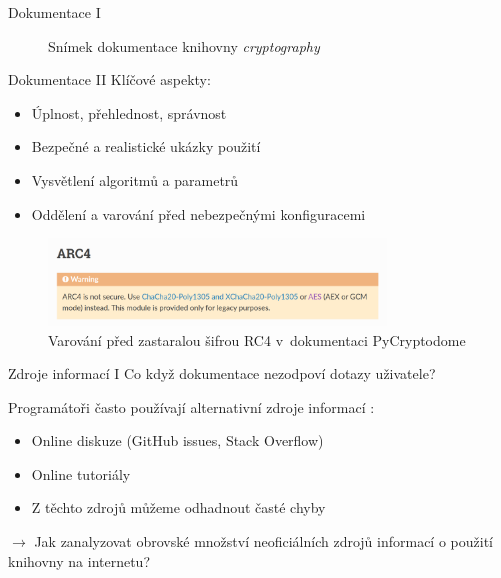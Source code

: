 \documentclass{beamer}
\newcommand{\textbc}[1]{{\usebeamercolor[fg]{titlelike} #1}}
\newenvironment{spaceditemize}[1][1em]
{ \begin{itemize}
    \setlength{\itemsep}{#1}
}{ \end{itemize} }
\begin{document}
\begin{frame}{Dokumentace I}
\begin{figure}
\begin{minipage}{0.53\textwidth}
            \caption{Snímek dokumentace knihovny \textit{cryptography} \cite{pycadoc}}
        \end{minipage}
    \end{figure}
\end{frame}

\begin{frame}{Dokumentace II}
    Klíčové aspekty:
    \vspace{0.5em}
    \begin{spaceditemize}[0.5em]
        \item Úplnost, přehlednost, správnost
        \item Bezpečné a realistické ukázky použití
        \item Vysvětlení algoritmů a parametrů
        \item Oddělení a varování před nebezpečnými konfiguracemi
    \end{spaceditemize}

    \begin{figure}
        \centering
        \includegraphics[width=0.8\textwidth]{media/doc-pcd.png}
        \caption{Varování před zastaralou šifrou RC4 v~dokumentaci PyCryptodome \cite{pcddoc}}
    \end{figure}
\end{frame}

\begin{frame}{Zdroje informací I}
    \textbc{Co když dokumentace nezodpoví dotazy uživatele?}

    \vspace{1em}
    Programátoři často používají alternativní zdroje informací \cite{worrisome}:
    
    \vspace{1em}
    \begin{spaceditemize}
        \item Online diskuze (GitHub issues, Stack Overflow)
        \item Online tutoriály
        \item Z těchto zdrojů můžeme odhadnout časté chyby
    \end{spaceditemize}

    \vspace{2em}
    \enskip $\rightarrow$ Jak zanalyzovat obrovské množství neoficiálních zdrojů informací o použití knihovny na internetu?
\end{frame}
\end{document}
